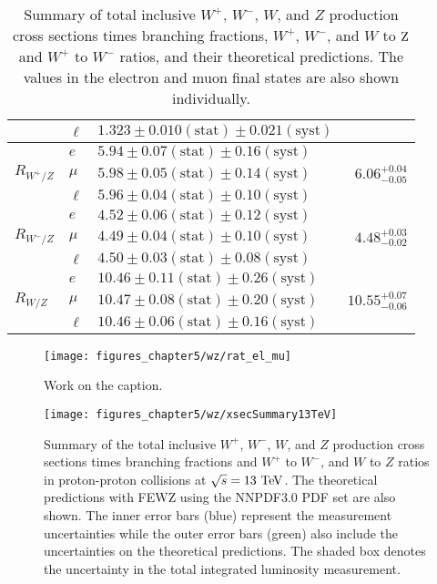 \begin{table*}[tbhp]
\begin {tabular} {lllr}
  & $\ell$ & $1.323 \pm 0.010 \mathrm{(stat)}\pm 0.021 \mathrm{(syst)}$ & \\
\hline
             & $e$   & $5.94 \pm 0.07 \mathrm{(stat)}\pm 0.16 \mathrm{(syst)}$ &
             \\
$R_{W^{+}/Z}$   & $\mu$ & $5.98 \pm 0.05 \mathrm{(stat)}\pm 0.14 \mathrm{(syst)}$ & $6.06^{+0.04}_{-0.05}$ \\
             & $\ell$ & $5.96 \pm 0.04 \mathrm{(stat)}\pm 0.10 \mathrm{(syst)}$ &  \\
\hline
             & $e$   & $4.52 \pm 0.06 \mathrm{(stat)}\pm 0.12 \mathrm{(syst)}$ &
             \\
$R_{W^{-}/Z}$   & $\mu$ & $4.49 \pm 0.04 \mathrm{(stat)}\pm 0.10 \mathrm{(syst)}$ & $4.48^{+0.03}_{-0.02}$ \\
             & $\ell$ & $4.50 \pm 0.03 \mathrm{(stat)}\pm 0.08 \mathrm{(syst)}$ &  \\
\hline
             & $e$   & $10.46 \pm 0.11 \mathrm{(stat)}\pm 0.26 \mathrm{(syst)}$ &
             \\
$R_{W/Z}$   & $\mu$ & $10.47 \pm 0.08 \mathrm{(stat)}\pm 0.20 \mathrm{(syst)}$ & $10.55^{+0.07}_{-0.06}$ \\
             & $\ell$ & $10.46 \pm 0.06 \mathrm{(stat)}\pm 0.16 \mathrm{(syst)}$ &  \\
\end{tabular}
\caption{ \label{tab:results13}
Summary of total inclusive $W^{+}$, $W^{-}$, $W$, and $Z$ production cross sections times
branching fractions, $W^{+}$,  $W^{-}$, and $W$ to $\mathrm{Z}$ and $W^{+}$ to $W^{-}$ ratios, and their
theoretical predictions. The values in the electron and muon final states are also shown individually.}
\end{table*}


\begin{figure}[h]
\centering
\texttt{[image: figures\_chapter5/wz/rat\_el\_mu]}
\caption{Work on the caption.}
\label{fig:lepton_univ}
\end{figure}


\begin{figure}[h]
\centering
\texttt{[image: figures\_chapter5/wz/xsecSummary13TeV]}
\caption{Summary of the total inclusive $W^+$, $W^-$, $W$, and $Z$ production cross sections times branching fractions and $W^+$ to $W^-$, and $W$ to $Z$ ratios in proton-proton collisions at $\sqrt{s}=13~\mathrm{Te\kern -0.1em V}$. The theoretical predictions with FEWZ using the NNPDF3.0 PDF set are also shown. The inner error bars (blue) represent the measurement uncertainties while the outer error bars (green) also include the uncertainties on the theoretical predictions. The shaded box denotes the uncertainty in the total integrated luminosity measurement.}
\label{fig:13tev}
\end{figure}

